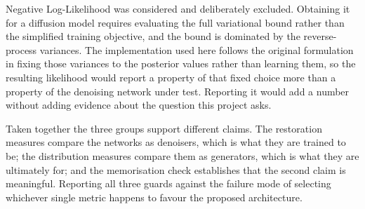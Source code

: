 Negative Log-Likelihood was considered and deliberately excluded. Obtaining it for a diffusion model
requires evaluating the full variational bound rather than the simplified training objective, and
the bound is dominated by the reverse-process variances. The implementation used here follows the
original formulation in fixing those variances to the posterior values rather than learning them, so
the resulting likelihood would report a property of that fixed choice more than a property of the
denoising network under test. Reporting it would add a number without adding evidence about the
question this project asks.

Taken together the three groups support different claims. The restoration measures compare the
networks as denoisers, which is what they are trained to be; the distribution measures compare them
as generators, which is what they are ultimately for; and the memorisation check establishes that
the second claim is meaningful. Reporting all three guards against the failure mode of selecting
whichever single metric happens to favour the proposed architecture.


